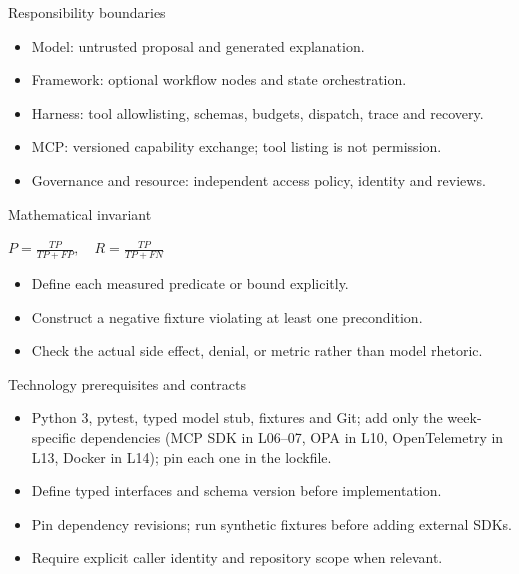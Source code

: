 \documentclass[aspectratio=169,10pt]{beamer}
\begin{document}
\begin{frame}{Responsibility boundaries}
\small
\begin{itemize}
\item Model: untrusted proposal and generated explanation.
\item Framework: optional workflow nodes and state orchestration.
\item Harness: tool allowlisting, schemas, budgets, dispatch, trace and recovery.
\item MCP: versioned capability exchange; tool listing is not permission.
\item Governance and resource: independent access policy, identity and reviews.
\end{itemize}

\end{frame}

\begin{frame}{Mathematical invariant}
\small
\begin{center}\Large $P=\frac{TP}{TP+FP},\quad R=\frac{TP}{TP+FN}$\end{center}
\begin{itemize}
\item Define each measured predicate or bound explicitly.
\item Construct a negative fixture violating at least one precondition.
\item Check the actual side effect, denial, or metric rather than model rhetoric.
\end{itemize}

\end{frame}

\begin{frame}{Technology prerequisites and contracts}
\small
\begin{itemize}
\item Python 3, pytest, typed model stub, fixtures and Git; add only the week-specific dependencies (MCP SDK in L06--07, OPA in L10, OpenTelemetry in L13, Docker in L14); pin each one in the lockfile.
\item Define typed interfaces and schema version before implementation.
\item Pin dependency revisions; run synthetic fixtures before adding external SDKs.
\item Require explicit caller identity and repository scope when relevant.
\end{itemize}

\end{frame}
\end{document}
